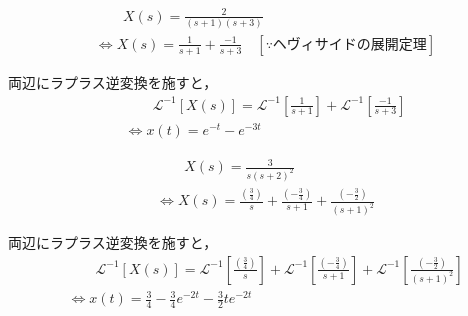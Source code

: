 \documentclass[a4paper,12pt]{article}
\begin{document}
\begin{tcolorbox}[title={ [16] (6) \( X(s)=\frac{ 2 }{ ( s + 1 ) ( s + 3 ) } \)}]
  \vspace{-3mm}
\begin{align*}
    &\qquad X(s) =\frac{ 2 }{ ( s + 1 ) ( s + 3 ) }  \\
    &\Leftrightarrow X(s) 
    = \frac{1}{s + 1}
    + \frac{-1}{s + 3} 
    \quad [\because ヘヴィサイドの展開定理]
\end{align*}

\quad 両辺にラプラス逆変換を施すと，
\vspace{-3mm}
\begin{align*}
    &\qquad \mathcal{L}^{-1} \left[ X(s) \right] 
    =\mathcal{L}^{-1} \left[ \frac{1}{s + 1} \right]
    +\mathcal{L}^{-1} \left[ \frac{-1}{s + 3} \right] \\
    &\Leftrightarrow x(t) = e^{-t} - e^{-3t}
\end{align*}
\end{tcolorbox}
\begin{tcolorbox}[title={ [16] (7) \( X(s)=\frac{ 3 }{ s ( s + 2)^2 } \)}]
  \vspace{-3mm}
\begin{align*}
    &\qquad X(s) =\frac{ 3 }{ s ( s + 2)^2 }  \\
    &\Leftrightarrow X(s) 
    = \frac{(\frac{3}{4})}{s}
    + \frac{(-\frac{3}{4})}{s + 1} 
    + \frac{(-\frac{3}{2})}{(s + 1)^2} 
\end{align*}

\quad 両辺にラプラス逆変換を施すと，
\vspace{-3mm}
\begin{align*}
    &\qquad \mathcal{L}^{-1} \left[ X(s) \right] 
    = \mathcal{L}^{-1} \left[\frac{(\frac{3}{4})}{s} \right]
    + \mathcal{L}^{-1} \left[ \frac{(-\frac{3}{4})}{s + 1} \right]
    + \mathcal{L}^{-1} \left[\frac{(-\frac{3}{2})}{(s + 1)^2}\right]\\
    &\Leftrightarrow x(t) = \frac{3}{4}-\frac{3}{4}e^{-2t}-\frac{3}{2}te^{-2t}
\end{align*}
\end{tcolorbox}
\end{document}
